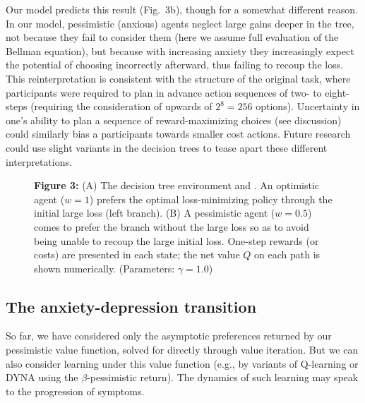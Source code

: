 \documentclass[11pt]{article} %
\begin{document}
Our model predicts this result (Fig.~3b), though for a somewhat different reason. In our model, pessimistic (anxious) agents neglect large gains deeper in the tree, not because they fail to consider them (here we assume full evaluation of the Bellman equation), but because with increasing anxiety they increasingly expect the potential of choosing incorrectly afterward, thus failing to recoup the loss. This reinterpretation is consistent with the structure of the original task\citep{Huys2012, Lally2017}, where participants were required to plan in advance action sequences of two- to eight-steps (requiring the consideration of upwards of $2^8 = 256$ options). Uncertainty in one's ability to plan a sequence of reward-maximizing choices (see discussion) could similarly bias a participants towards smaller cost actions. Future research could use slight variants in the decision trees to tease apart these different interpretations.


\begin{figure}[!b]
  \centerline{%
  }
  \par \textbf{Figure 3:} (A) The decision tree environment \cite{Huys2012} and \cite{Lally2017}. An optimistic agent ($w=1$) prefers the optimal loss-minimizing policy through the initial large loss (left branch). (B) A pessimistic agent ($w=0.5$) comes to prefer the branch without the large loss so as to avoid being unable to recoup the large initial loss. One-step rewards (or costs) are presented in each state; the net value $Q$ on each path is shown numerically. (Parameters: $\gamma = 1.0$)
\end{figure}

\subsection{The anxiety-depression transition}

So far, we have considered only the asymptotic preferences returned by our pessimistic value function, solved for directly through value iteration. But we can also consider learning under this value function (e.g., by variants of Q-learning\citep{SuttonBarto2018} or DYNA\citep{sutton1991, momennejad_successor_2017, russek_predictive_2017} using the $\beta$-pessimistic return). The dynamics of such learning may speak to the progression of symptoms.
\end{document}
